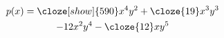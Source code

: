 \documentclass{article}
\begin{document}
{}

\def\clozefont{}

\begin{multline*}
p(x) = \cloze[show]{590}x^4y^2 + \cloze{19}x^3y^3\\
- 12x^2y^4 - \cloze{12}xy^5
\end{multline*}
\end{document}
